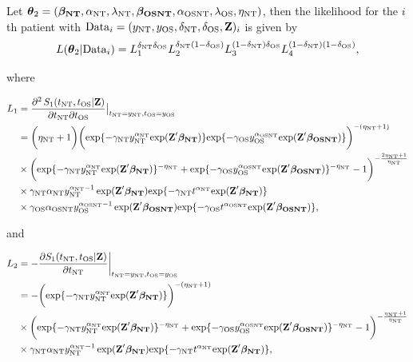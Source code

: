 Let
$\boldsymbol{\theta}_2=(\boldsymbol{\beta_{\rm NT}}, \alpha_{\rm NT}, \lambda_{\rm NT}, \boldsymbol{\beta_{\rm OSNT}},
\alpha_{\rm OSNT}, \lambda_{\rm OS}, \eta_{\rm NT})$,  then the
likelihood for the $i$th patient with ${\rm Data}_i=(y_{\rm NT}, y_{\rm OS},
\delta_{\rm NT}, \delta_{\rm OS}, \textbf{Z})_i$ is given by
$$
L(\boldsymbol{\theta}_2|{\rm Data}_i)
=L_1^{\delta_{\rm NT}\delta_{\rm OS}}
L_2^{\delta_{\rm NT}(1-\delta_{\rm OS})}L_3^{(1-\delta_{\rm NT})\delta_{\rm OS}}
L_4^{(1-\delta_{\rm NT})(1-\delta_{\rm OS})}, 
$$

where

\begin{align*}
L_1 &=\frac{\partial^2\, S_1(t_{\rm NT}, t_{\rm OS}|\textbf{Z})}{\partial t_{\rm NT} \partial t_{\rm OS}}\big|_{t_{\rm NT}=y_{\rm NT},t_{\rm OS}=y_{\rm OS}}
\\
& =\bigg(\eta_{\rm NT}+1\bigg)\bigg(\mathrm{exp}\{-\gamma_{\rm NT} y_{\rm NT}^{\alpha_{\rm NT}}
\mathrm{exp}(\textbf{Z}' \boldsymbol{\beta_{\rm NT}} )\} \mathrm{exp}\{-\gamma_{\rm OS} y_{\rm OS}^{\alpha_{\rm OSNT}}
\mathrm{exp}(\textbf{Z}' \boldsymbol{\beta_{\rm OSNT}} )\}\bigg)^{-(\eta_{\rm NT}+1)} \\
& \times \bigg(\mathrm{exp}\{-\gamma_{\rm NT} y_{\rm NT}^{\alpha_{\rm NT}}
\mathrm{exp}(\textbf{Z}' \boldsymbol{\beta_{\rm NT}} )\}^{-\eta_{\rm NT}}+\mathrm{exp}\{-\gamma_{\rm OS} y_{\rm OS}^{\alpha_{\rm OSNT}}
\mathrm{exp}(\textbf{Z}' \boldsymbol{\beta_{\rm OSNT}} )\}^{-\eta_{\rm NT}}-1\bigg)^{-\frac{2\eta_{\rm NT}+1}{\eta_{\rm NT}}} \\
&\times \gamma_{\rm NT} \alpha_{\rm NT} y_{\rm NT}^{{\alpha_{\rm NT} -1}} \exp(\textbf{Z}' \boldsymbol{\beta_{\rm NT}}) \mathrm{exp}\{-\gamma_{\rm NT} t^{\alpha_{\rm NT}}
\mathrm{exp}(\textbf{Z}' \boldsymbol{\beta_{\rm NT}} )\}\\
&\times \gamma_{\rm OS} \alpha_{\rm OSNT} y_{\rm OS}^{{\alpha_{\rm OSNT} -1}} \exp(\textbf{Z}' \boldsymbol{\beta_{\rm OSNT}}) \mathrm{exp}\{-\gamma_{\rm OS} t^{\alpha_{\rm OSNT}}
\mathrm{exp}(\textbf{Z}' \boldsymbol{\beta_{\rm OSNT}} )\},
\end{align*}

and


\begin{align*}
L_2&=-\frac{\partial S_1(t_{\rm NT}, t_{\rm OS}|\textbf{Z})}{\partial t_{\rm NT}}\bigg|_{t_{\rm NT}=y_{\rm NT},t_{\rm OS}=y_{\rm OS}} \\
&=-\bigg(\mathrm{exp}\{-\gamma_{\rm NT} y_{\rm NT}^{\alpha_{\rm NT}}
\mathrm{exp}(\textbf{Z}' \boldsymbol{\beta_{\rm NT}} )\}\bigg)^{-(\eta_{\rm NT}+1)}\\
&\times \bigg(\mathrm{exp}\{-\gamma_{\rm NT} y_{\rm NT}^{\alpha_{\rm NT}}
\mathrm{exp}(\textbf{Z}' \boldsymbol{\beta_{\rm NT}} )\}^{-\eta_{\rm NT}}+\mathrm{exp}\{-\gamma_{\rm OS} y_{\rm OS}^{\alpha_{\rm OSNT}}
\mathrm{exp}(\textbf{Z}' \boldsymbol{\beta_{\rm OSNT}} )\}^{-\eta_{\rm NT}}-1\bigg)^{-\frac{\eta_{\rm NT}+1}{\eta_{\rm NT}}}\\
&\times \gamma_{\rm NT} \alpha_{\rm NT} y_{\rm NT}^{{\alpha_{\rm NT} -1}} \exp(\textbf{Z}' \boldsymbol{\beta_{\rm NT}}) \mathrm{exp}\{-\gamma_{\rm NT} t^{\alpha_{\rm NT}}
\mathrm{exp}(\textbf{Z}' \boldsymbol{\beta_{\rm NT}} )\},
\end{align*}


